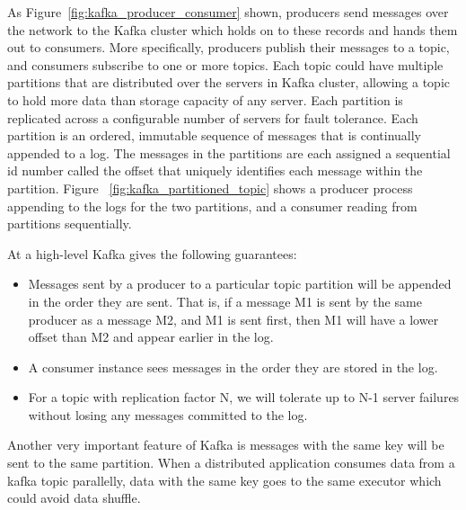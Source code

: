 As Figure~\ref{fig:kafka_producer_consumer} shown, producers send messages over the network to the Kafka cluster which holds on to these records and hands them out to consumers. More specifically, producers publish their messages to a topic, and consumers subscribe to one or more topics. Each topic could have multiple partitions that are distributed over the servers in Kafka cluster, allowing a topic to hold more data than storage capacity of any server. Each partition is replicated across a configurable number of servers for fault tolerance. Each partition is an ordered, immutable sequence of messages that is continually appended to a log. The messages in the partitions are each assigned a sequential id number called the offset that uniquely identifies each message within the partition.  Figure ~\ref{fig:kafka_partitioned_topic} shows a producer process appending to the logs for the two partitions, and a consumer reading from partitions sequentially. 

At a high-level Kafka gives the following guarantees: \cite{Kafka}
\begin{itemize}
  \item Messages sent by a producer to a particular topic partition will be appended in the order they are sent. That is, if a message M1 is sent by the same producer as a message M2, and M1 is sent first, then M1 will have a lower offset than M2 and appear earlier in the log. 
  \item A consumer instance sees messages in the order they are stored in the log.
  \item For a topic with replication factor N, we will tolerate up to N-1 server failures without losing any messages committed to the log.
\end{itemize}


Another very important feature of Kafka is messages with the same key will be sent to the same partition. When a distributed application consumes data from a kafka topic parallelly,  data with the same key goes to the same executor which could avoid data shuffle.


